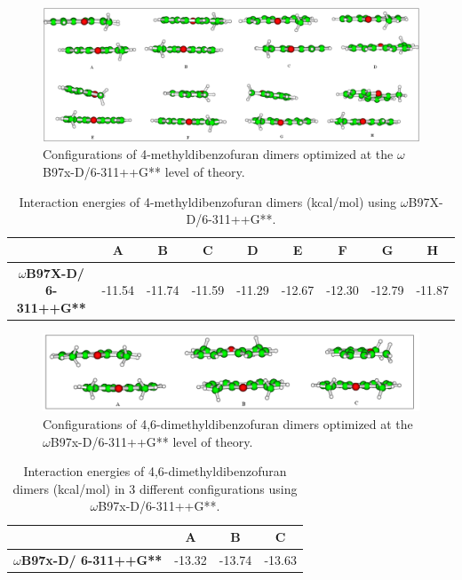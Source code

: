 \begin{figure}[H]
	\begin{center}
		\includegraphics[scale=0.8]{image/4-mO-dim}
	\end{center}
	\caption{Configurations of 4-methyldibenzofuran dimers optimized at the $\omega$B97x-D/6-311++G** level of theory.}
\end{figure}

\begin{table}[H]
	\caption{Interaction energies of  4-methyldibenzofuran dimers (kcal/mol) using $\omega$B97X-D/6-311++G**.}
	\begin{center}
		\begin{tabular}{c c c c c c c c c}
			\hline
			& \textbf{A} & \textbf{B} & \textbf{C} & \textbf{D} & \textbf{E} & \textbf{F} & \textbf{G} & \textbf{H} \\ \hline
			\textbf{$\omega$B97X-D/
				6-311++G**} & -11.54 & -11.74 & -11.59 & -11.29 & -12.67 & -12.30 & -12.79 & -11.87 \\ \hline
		\end{tabular}
	\end{center}
	\label{}
\end{table}


\begin{figure}[H]
	\begin{center}
		\includegraphics[scale=0.9]{image/46-dmdibf-dim}
	\end{center}
	\caption{Configurations of 4,6-dimethyldibenzofuran dimers optimized at the $\omega$B97x-D/6-311++G** level of theory.}
\end{figure}


\begin{table}[htbp]
	\caption{Interaction energies of 4,6-dimethyldibenzofuran dimers (kcal/mol) in 3 different configurations using $\omega$B97x-D/6-311++G**.}
	\begin{center}
		\begin{tabular}{cccc}
			\toprule
			& \textbf{A} & \textbf{B} & \textbf{C} \\ 
			\midrule
			\textbf{$\omega$B97x-D/
				6-311++G** }& -13.32	& -13.74	& -13.63	\\ 
			\bottomrule
		\end{tabular}
	\end{center}
	\label{}
\end{table}


